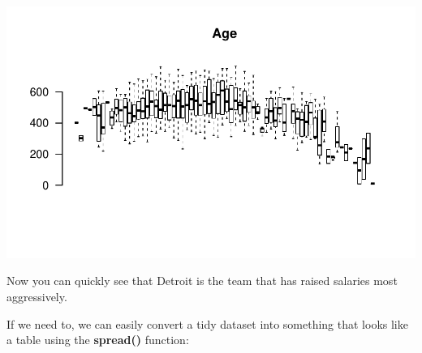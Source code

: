 \documentclass[]{book}
\newenvironment{Shaded}{\begin{snugshade}}{\end{snugshade}}
\newcommand{\DataTypeTok}[1]{\textcolor[rgb]{0.13,0.29,0.53}{#1}}
\newcommand{\DecValTok}[1]{\textcolor[rgb]{0.00,0.00,0.81}{#1}}
\newcommand{\KeywordTok}[1]{\textcolor[rgb]{0.13,0.29,0.53}{\textbf{#1}}}
\newcommand{\NormalTok}[1]{#1}
\newcommand{\OperatorTok}[1]{\textcolor[rgb]{0.81,0.36,0.00}{\textbf{#1}}}
\newcommand{\StringTok}[1]{\textcolor[rgb]{0.31,0.60,0.02}{#1}}
\theoremstyle{definition}
\theoremstyle{definition}
\theoremstyle{definition}
\theoremstyle{remark}
\begin{document}
\begin{Shaded}
\end{Shaded}

\begin{center}\includegraphics[width=0.7\linewidth]{DS4PS-I_files/figure-latex/unnamed-chunk-165-1} \end{center}

Now you can quickly see that Detroit is the team that has raised
salaries most aggressively.

If we need to, we can easily convert a tidy dataset into something that
looks like a table using the \textbf{spread()} function:
\end{document}

